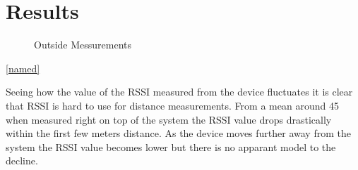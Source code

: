\section{Results}
\label{sec_results}

\begin{figure}		



\caption{ Outside Messurements }
\label{graf_OutsideMesurements}

\end{figure}

\begin{center}
\ref{named}
\end{center}

Seeing how the value of the RSSI measured from the device fluctuates it is clear that RSSI is hard to use for distance measurements. From a mean around 45 when measured right on top of the system the RSSI value drops drastically within the first few meters distance. As the device moves further away from the system the RSSI value becomes lower but there is no apparant model to the decline.

